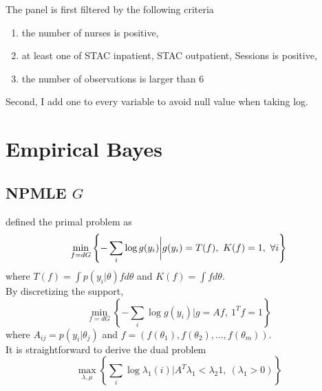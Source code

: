 \documentclass[12pt]{article}
\begin{document}
The panel is first filtered by the following criteria
\begin{enumerate}
    \item the number of nurses is positive,
    \item at least one of STAC inpatient, STAC outpatient, Sessions is positive,
    \item the number of observations is larger than 6
\end{enumerate}
Second, I add one to every variable to avoid null value when taking log.

\section{Empirical Bayes}
\subsection{NPMLE $G$}
\citet{koenker2014convex} defined the primal problem as
\begin{equation*}
    \min_{f=dG}\left\{-\sum_i \log g(y_i)\bigg |g(y_i) = T(f),\ K(f)=1,\ \forall i \right\}
\end{equation*}
where $ T(f)=\int p(y_i |\theta)fd\theta $ and  $K(f)= \int f d\theta$.\\
By discretizing the support,
\begin{equation*}
    \min_{f=dG}\left\{-\sum_i \log g(y_i)\bigg |g=Af,\ {1^T}f=1\right\}
\end{equation*}
where $A_{ij}= p(y_i|\theta_j) $ and $ f = (f(\theta_1),f(\theta_2),\ldots,f(\theta_m))$.\\
It is straightforward to derive the dual problem
\begin{equation*}
    \max_{\lambda,\mu} \left\{ \sum_i \log \lambda_1(i) \bigg| A^T\lambda_1 < \lambda_2 1,\ (\lambda_1>0) \right\}
\end{equation*}
\end{document}
